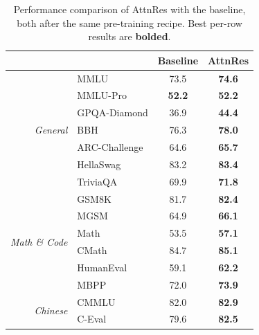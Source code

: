 \begin{table}[!ht]
    \centering
    \small
    \renewcommand{\arraystretch}{1.1}
    \caption{Performance comparison of AttnRes with the baseline, both after the same pre-training recipe. Best per-row results are \textbf{bolded}.}
    \setlength{\tabcolsep}{12pt}
    \label{tab:benchmarkresult}
    \begin{tabular}{@{}r l c c}
        \toprule
         &               & Baseline      & AttnRes       \\
        \midrule
        \multirow{7}{*}{\textit{General}}
         & MMLU          & 73.5          & \textbf{74.6} \\
         & MMLU-Pro      & \textbf{52.2} & \textbf{52.2} \\
         & GPQA-Diamond  & 36.9          & \textbf{44.4} \\
         & BBH           & 76.3          & \textbf{78.0} \\
         & ARC-Challenge & 64.6          & \textbf{65.7} \\
         & HellaSwag     & 83.2          & \textbf{83.4} \\
         & TriviaQA      & 69.9          & \textbf{71.8} \\
        \midrule
        \multirow{6}{*}{\textit{Math \& Code}}
         & GSM8K         & 81.7          & \textbf{82.4} \\
         & MGSM          & 64.9          & \textbf{66.1} \\
         & Math          & 53.5          & \textbf{57.1} \\
         & CMath         & 84.7          & \textbf{85.1} \\
         & HumanEval     & 59.1          & \textbf{62.2} \\
         & MBPP          & 72.0          & \textbf{73.9} \\
        \midrule
        \multirow{2}{*}{\textit{Chinese}}
         & CMMLU         & 82.0          & \textbf{82.9} \\
         & C-Eval        & 79.6          & \textbf{82.5} \\
        \bottomrule
    \end{tabular}
    \label{tab:pretrain}
\end{table}